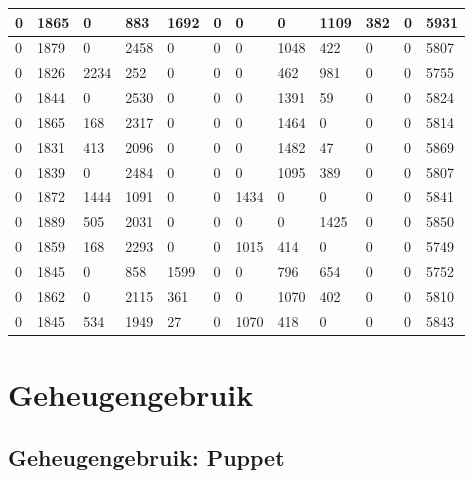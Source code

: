 \begin{longtable}{ | l | l | l | l | l | l | l | l | l | l | l || l | }
	0 & 1865 & 0 & 883 & 1692 & 0 & 0 & 0 & 1109 & 382 & 0 & 5931   \\ \hline
	0 & 1879 & 0 & 2458 & 0 & 0 & 0 & 1048 & 422 & 0 & 0 & 5807 \\ \hline
	0 & 1826 & 2234 & 252 & 0 & 0 & 0 & 462 & 981 & 0 & 0 & 5755   \\ \hline
	0 & 1844 & 0 & 2530 & 0 & 0 & 0 & 1391 & 59 & 0 & 0 & 5824    \\ \hline
	0 & 1865 & 168 & 2317 & 0 & 0 & 0 & 1464 & 0 & 0 & 0 & 5814  \\ \hline
	0 & 1831 & 413 & 2096 & 0 & 0 & 0 & 1482 & 47 & 0 & 0 & 5869    \\ \hline
	0 & 1839 & 0 & 2484 & 0 & 0 & 0 & 1095 & 389 & 0 & 0 & 5807   \\ \hline
	0 & 1872 & 1444 & 1091 & 0 & 0 & 1434 & 0 & 0 & 0 & 0 & 5841 \\\hline
	0 & 1889 & 505 & 2031 & 0 & 0 & 0 & 0 & 1425 & 0 & 0 & 5850    \\ \hline
	0 & 1859 & 168 & 2293 & 0 & 0 & 1015 & 414 & 0 & 0 & 0 & 5749  \\ \hline
	0 & 1845 & 0 & 858 & 1599 & 0 & 0 & 796 & 654 & 0 & 0 & 5752   \\ \hline
	0 & 1862 & 0 & 2115 & 361 & 0 & 0 & 1070 & 402 & 0 & 0 & 5810   \\ \hline
	0 & 1845 & 534 & 1949 & 27 & 0 & 1070 & 418 & 0 & 0 & 0 & 5843   \\ \hline



\end{longtable}


\section*{ Geheugengebruik}
\label{dataset:geheugengebruik}

\subsection*{Geheugengebruik: Puppet}
\label{dataset:deploytijden:puppet}

